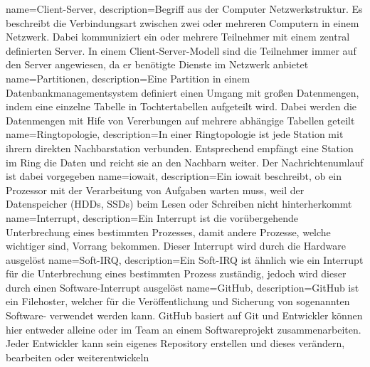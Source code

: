 {
  name=Client-Server,
  description={Begriff aus der Computer Netzwerkstruktur. Es beschreibt die
               Verbindungsart zwischen zwei oder mehreren Computern in einem
               Netzwerk. Dabei kommuniziert ein oder mehrere Teilnehmer mit
               einem zentral definierten Server. In einem Client-Server-Modell
               sind die Teilnehmer immer auf den Server angewiesen, da er
               benötigte Dienste im Netzwerk anbietet}
}
{
  name=Partitionen,
  description={Eine Partition in einem Datenbankmanagementsystem definiert
               einen Umgang mit großen Datenmengen, indem eine einzelne Tabelle
               in Tochtertabellen aufgeteilt wird. Dabei werden die Datenmengen
               mit Hife von Vererbungen auf mehrere abhängige Tabellen
               geteilt}
}
{
  name=Ringtopologie,
  description={In einer Ringtopologie ist jede Station mit ihrern direkten
               Nachbarstation verbunden. Entsprechend empfängt eine Station im
               Ring die Daten und reicht sie an den Nachbarn weiter. Der
               Nachrichtenumlauf ist dabei vorgegeben}
}
{
  name=iowait,
  description={Ein iowait beschreibt, ob ein Prozessor mit der Verarbeitung von
              Aufgaben warten muss, weil der Datenspeicher (HDDs, SSDs) beim
              Lesen oder Schreiben nicht hinterherkommt}
}
{
  name=Interrupt,
  description={Ein Interrupt ist die vorübergehende Unterbrechung eines
               bestimmten Prozesses, damit andere Prozesse, welche wichtiger
               sind, Vorrang bekommen. Dieser Interrupt wird durch die Hardware
               ausgelöst}
}
{
  name=Soft-IRQ,
  description={Ein Soft-IRQ ist ähnlich wie ein \gls{Interrupt} für die
              Unterbrechung eines bestimmten Prozess zuständig, jedoch wird
              dieser durch einen Software-Interrupt ausgelöst}
}
{
  name=GitHub,
  description={GitHub ist ein Filehoster, welcher für die Veröffentlichung und
               Sicherung von sogenannten
               Software- verwendet werden
               kann. GitHub basiert auf \gls{Git} und Entwickler können hier
               entweder alleine oder im Team an einem Softwareprojekt
               zusammenarbeiten. Jeder Entwickler kann sein eigenes
               \gls{Repository} erstellen und dieses verändern, bearbeiten oder
               weiterentwickeln}
}
